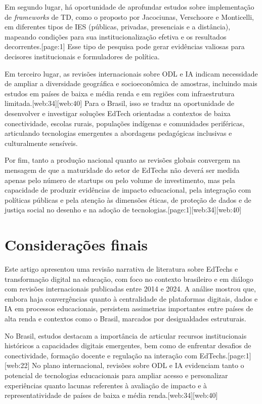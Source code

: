 \documentclass[12pt]{article}
\begin{document}
Em segundo lugar, h\'a oportunidade de aprofundar estudos sobre implementa\c{c}\~ao de \emph{frameworks} de TD, como o proposto por Jacociunas, Verschoore e Monticelli, em diferentes tipos de IES (p\'ublicas, privadas, presenciais e a dist\^ancia), mapeando condi\c{c}\~oes para sua institucionaliza\c{c}\~ao efetiva e os resultados decorrentes.[page:1] Esse tipo de pesquisa pode gerar evid\^encias valiosas para decisores institucionais e formuladores de pol\'itica.

Em terceiro lugar, as revis\~oes internacionais sobre ODL e IA indicam necessidade de ampliar a diversidade geogr\'afica e socioecon\^omica de amostras, incluindo mais estudos em pa\'ises de baixa e m\'edia renda e em regi\~oes com infraestrutura limitada.[web:34][web:40] Para o Brasil, isso se traduz na oportunidade de desenvolver e investigar solu\c{c}\~oes EdTech orientadas a contextos de baixa conectividade, escolas rurais, popula\c{c}\~oes ind\'igenas e comunidades perif\'ericas, articulando tecnologias emergentes a abordagens pedag\'ogicas inclusivas e culturalmente sens\'iveis.

Por fim, tanto a produ\c{c}\~ao nacional quanto as revis\~oes globais convergem na mensagem de que a maturidade do setor de EdTechs n\~ao dever\'a ser medida apenas pelo n\'umero de startups ou pelo volume de investimento, mas pela capacidade de produzir evid\^encias de impacto educacional, pela integra\c{c}\~ao com pol\'iticas p\'ublicas e pela aten\c{c}\~ao \`as dimens\~oes \'eticas, de prote\c{c}\~ao de dados e de justi\c{c}a social no desenho e na ado\c{c}\~ao de tecnologias.[page:1][web:34][web:40]

\section{Considera\c{c}\~oes finais}

Este artigo apresentou uma revis\~ao narrativa de literatura sobre EdTechs e transforma\c{c}\~ao digital na educa\c{c}\~ao, com foco no contexto brasileiro e em di\'alogo com revis\~oes internacionais publicadas entre 2014 e 2024. A an\'alise mostrou que, embora haja converg\^encias quanto \`a centralidade de plataformas digitais, dados e IA em processos educacionais, persistem assimetrias importantes entre pa\'ises de alta renda e contextos como o Brasil, marcados por desigualdades estruturais.

No Brasil, estudos destacam a import\^ancia de articular recursos institucionais hist\'oricos a capacidades digitais emergentes, bem como de enfrentar desafios de conectividade, forma\c{c}\~ao docente e regula\c{c}\~ao na intera\c{c}\~ao com EdTechs.[page:1][web:22] No plano internacional, revis\~oes sobre ODL e IA evidenciam tanto o potencial de tecnologias educacionais para ampliar acesso e personalizar experi\^encias quanto lacunas referentes \`a avalia\c{c}\~ao de impacto e \`a representatividade de pa\'ises de baixa e m\'edia renda.[web:34][web:40]
\end{document}
